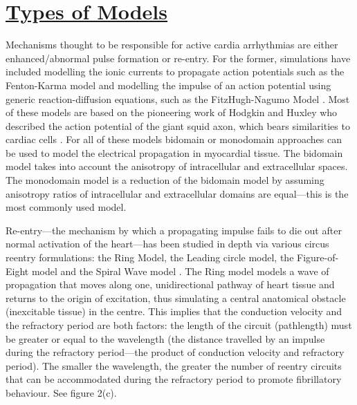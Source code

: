 \documentclass[twocolumn]{article}
\begin{document}

\section{\textbf{\underline{Types of Models}}} %

Mechanisms thought to be responsible for active cardia arrhythmias are either enhanced/abnormal pulse formation or re-entry. For the former, simulations have included modelling the ionic currents to propagate action potentials such as the Fenton-Karma model \cite{Grandi} \cite{Fenton} and modelling the impulse of an action potential using generic reaction-diffusion equations, such as the FitzHugh-Nagumo Model \cite{FitzHugh}. Most of these models are based on the pioneering work of Hodgkin and Huxley who described the action potential of the giant squid axon, which bears similarities to cardiac cells \cite{Hodgkin}. %
 For all of these models bidomain or monodomain approaches can be used to model the electrical propagation in myocardial tissue. %
  The bidomain model takes into account the anisotropy of intracellular and extracellular spaces. The monodomain model is a reduction of the bidomain model by assuming anisotropy ratios of intracellular and extracellular domains are equal---this is the most commonly used model.%

Re-entry---the mechanism by which a propagating impulse fails to die out after normal activation of the heart---has been studied in depth via various circus reentry formulations: the Ring Model, the Leading circle model, the Figure-of-Eight model and the Spiral Wave model \cite{Antze} \cite{Tusscher}. The Ring model models a wave of propagation that moves along one, unidirectional pathway of heart tissue and returns to the origin of excitation, thus simulating a central anatomical obstacle (inexcitable tissue) in the centre. This implies that the conduction velocity and the refractory period are both factors: the length of the circuit (pathlength) must be greater or equal to the wavelength (the distance travelled by an impulse during the refractory period---the product of conduction velocity and refractory period). The smaller the wavelength, the greater the number of reentry circuits that can be accommodated during the refractory period to promote fibrillatory behaviour. See figure 2(c).
\end{document}
